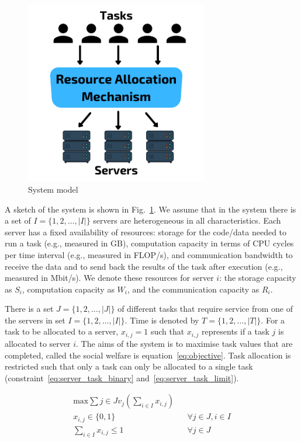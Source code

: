 \begin{figure}
    \centering
    \includegraphics[width=8cm]{figures/system_model.pdf}
    \caption{System model}
    \label{fig:system_model}
\end{figure}

A sketch of the system is shown in Fig.~\ref{fig:system_model}.
We assume that in the system there is a set of $I = \{1,2,\ldots,\left|I\right|\}$ servers are heterogeneous in all
characteristics. Each server has a fixed availability of resources: storage for the code/data needed to run a task
(e.g., measured in GB), computation capacity in terms of CPU cycles per time interval (e.g., measured in FLOP/s),
and communication bandwidth to receive the data and to send back the results of the task after execution
(e.g., measured in Mbit/s). We denote these resources for server $i$: the storage capacity as $S_i$, computation
capacity as $W_i$, and the communication capacity as $R_i$.

There is a set $J = \{1,2,\ldots,\left| J \right|\}$ of  different tasks that require service from one of the servers
in set $I = \{1,2,\ldots, \left| I \right|\}$. Time is denoted by $T = \{1, 2, \ldots, \left| T \right|\}$. For a task
to be allocated to a server, $x_{i,j} = 1$ such that $x_{i,j}$ represents if a task $j$ is allocated to server $i$.
The aims of the system is to maximise task values that are completed, called the social welfare is
equation~\ref{eq:objective}. Task allocation is restricted such that only a task can only be allocated to a single task
(constraint~\ref{eq:server_task_binary} and~\ref{eq:server_task_limit}).

\begin{align}
    \text{max} \sum{j \in J} v_j \left( \sum_{i \in I} x_{i,j} \right) \label{eq:objective} \\
    x_{i,j} \in \{0, 1\} && \forall{j \in J, i \in I} \label{eq:server_task_binary} \\
    \sum_{i \in I} x_{i,j} \leq 1 && \forall{j \in J} \label{eq:server_task_limit} \\
\end{align}

